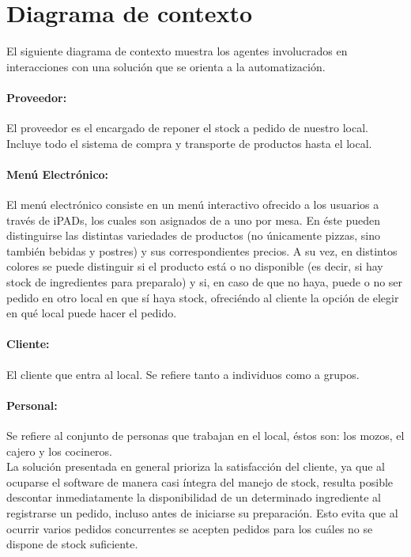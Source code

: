 \documentclass[a4paper,10pt]{article}
\begin{document}
\section*{Diagrama de contexto}
El siguiente diagrama de contexto muestra los agentes involucrados en interacciones con una solución que se orienta a la automatización. 

\paragraph{Proveedor:}
El proveedor es el encargado de reponer el stock a pedido de nuestro local. Incluye todo el sistema de compra y transporte de productos hasta el local.
\\
\paragraph{Menú Electrónico:}
El menú electrónico consiste en un menú interactivo ofrecido a los usuarios a través de iPADs, los cuales son asignados de a uno por mesa. En éste pueden distinguirse las distintas variedades de productos (no únicamente pizzas, sino también bebidas y postres) y sus correspondientes precios. A su vez, en distintos colores se puede distinguir si el producto está o no disponible (es decir, si hay stock de ingredientes para preparalo) y si, en caso de que no haya, puede o no ser pedido en otro local en que sí haya stock, ofreciéndo al cliente la opción de elegir en qué local puede hacer el pedido.
\\
\paragraph{Cliente:}
El cliente que entra al local. Se refiere tanto a individuos como a grupos.
\\
\paragraph{Personal:}
Se refiere al conjunto de personas que trabajan en el local, éstos son: los mozos, el cajero y los cocineros.
\\

La solución presentada en general prioriza la satisfacción del cliente, ya que al ocuparse el software de manera casi íntegra del manejo de stock, resulta posible descontar inmediatamente la disponibilidad de un determinado ingrediente al registrarse un pedido, incluso antes de iniciarse su preparación. Esto evita que al ocurrir varios pedidos concurrentes se acepten pedidos para los cuáles no se dispone de stock suficiente.
\end{document}

